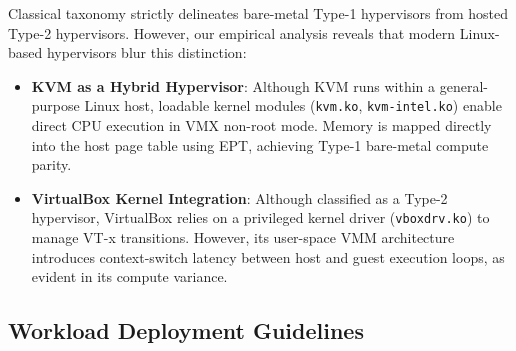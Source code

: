 Classical taxonomy strictly delineates bare-metal Type-1 hypervisors from hosted Type-2 hypervisors. However, our empirical analysis reveals that modern Linux-based hypervisors blur this distinction:
\begin{itemize}
    \item \textbf{KVM as a Hybrid Hypervisor}: Although KVM runs within a general-purpose Linux host, loadable kernel modules (\texttt{kvm.ko}, \texttt{kvm-intel.ko}) enable direct CPU execution in VMX non-root mode. Memory is mapped directly into the host page table using EPT, achieving Type-1 bare-metal compute parity.
    \item \textbf{VirtualBox Kernel Integration}: Although classified as a Type-2 hypervisor, VirtualBox relies on a privileged kernel driver (\texttt{vboxdrv.ko}) to manage VT-x transitions. However, its user-space VMM architecture introduces context-switch latency between host and guest execution loops, as evident in its compute variance.
\end{itemize}

\subsection{Workload Deployment Guidelines}
\label{subsec:deployment_guidelines}

